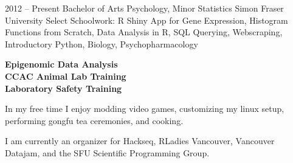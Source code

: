\documentclass[9pt]{developercv} %
\begin{document}
\vspace{-2em}
\vspace{-.25em}
\begin{entrylist}
	\entry
		{2012 -- Present}
		{Bachelor of Arts Psychology, Minor Statistics}
		{Simon Fraser University}
		{Select Schoolwork: R Shiny App for Gene Expression, Histogram Functions from Scratch, Data Analysis in R, SQL Querying, Webscraping, Introductory Python, Biology, Psychopharmacology}
\end{entrylist}
\vspace{-1em}
\begin{minipage}[t]{0.3\textwidth}
	\vspace{-\baselineskip} %

	\vspace{-.5em}

	\textbf{Epigenomic Data Analysis}\\
	\textbf{CCAC Animal Lab Training}\\
	\textbf{Laboratory Safety Training}
\end{minipage}
\hfill
\begin{minipage}[t]{0.3\textwidth}
	\vspace{-\baselineskip} %
	
	\vspace{-.5em}
	
	In my free time I enjoy modding video games, customizing my linux setup, performing gongfu tea ceremonies, and cooking.
	
\end{minipage}
\hfill
\begin{minipage}[t]{0.3\textwidth}
	\vspace{-\baselineskip} %
	
    \vspace{-.5em}
    
	I am currently an organizer for Hackseq, RLadies Vancouver, Vancouver Datajam, and the SFU Scientific Programming Group.
\end{minipage}
\end{document}
